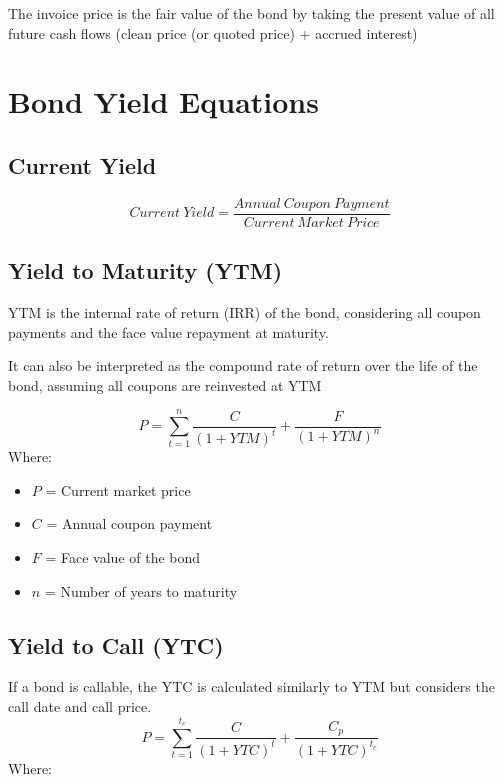 \documentclass[
]{book}
\providecommand{\tightlist}{%
  \setlength{\itemsep}{0pt}\setlength{\parskip}{0pt}}
\begin{document}
The invoice price is the fair value of the bond by taking the present
value of all future cash flows (clean price (or quoted price) + accrued
interest)

\hypertarget{bond-yield-equations}{%
\section{Bond Yield Equations}\label{bond-yield-equations}}

\hypertarget{current-yield}{%
\subsection{Current Yield}\label{current-yield}}

\[
Current\ Yield = \frac{Annual\ Coupon\ Payment}{Current\ Market\ Price}
\]

\hypertarget{yield-to-maturity-ytm}{%
\subsection{Yield to Maturity (YTM)}\label{yield-to-maturity-ytm}}

YTM is the internal rate of return (IRR) of the bond, considering all
coupon payments and the face value repayment at maturity.

It can also be interpreted as the compound rate of return over the life
of the bond, assuming all coupons are reinvested at YTM

\[
P = \sum_{t=1}^{n} \frac{C}{(1+YTM)^t} + \frac{F}{(1+YTM)^n}
\] Where:

\begin{itemize}
\tightlist
\item
  \(P\) = Current market price
\item
  \(C\) = Annual coupon payment
\item
  \(F\) = Face value of the bond
\item
  \(n\) = Number of years to maturity
\end{itemize}

\hypertarget{yield-to-call-ytc}{%
\subsection{Yield to Call (YTC)}\label{yield-to-call-ytc}}

If a bond is callable, the YTC is calculated similarly to YTM but
considers the call date and call price. \[
P = \sum_{t=1}^{t_c} \frac{C}{(1+YTC)^t} + \frac{C_p}{(1+YTC)^{t_c}}
\] Where:
\end{document}
